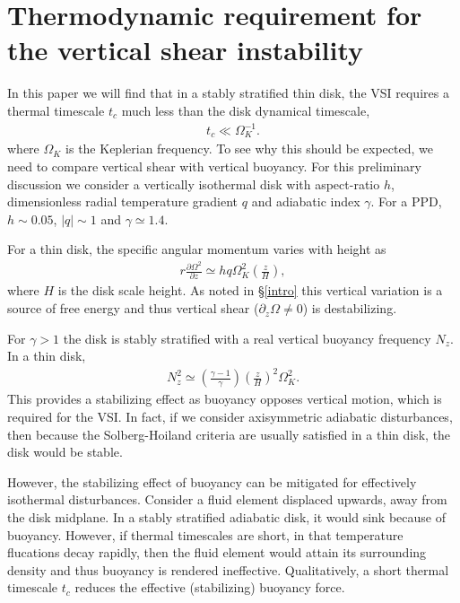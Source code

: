 \documentclass[iop]{emulateapj}
\newcommand{\p}{\partial}
\begin{document}
\section{Thermodynamic requirement for the vertical shear instability}\label{vsi_require}     In this paper we will find that in a stably stratified thin disk, the VSI  
requires a thermal timescale $t_c$ much less than the
disk dynamical timescale, 
\begin{align}
  t _c \ll \Omega_K^{-1}. 
\end{align}
where $\Omega_K$ is the Keplerian frequency. 
To see why this should be expected, we need to compare vertical shear
with vertical buoyancy. For this preliminary discussion we consider a
vertically isothermal disk with aspect-ratio $ h$,  
dimensionless radial temperature gradient $q$ and adiabatic index
$\gamma$. For a PPD, $ h \sim 0.05$, $|q|\sim 1$ and $\gamma\simeq 1.4$. 

For a thin disk, the specific angular momentum varies with height as 
\begin{align}\label{vshear_thin}
  r \frac{\p \Omega^2 }{\p z} \simeq  h q \Omega_K^2\left(\frac{z}{H}\right),
\end{align}
where $H$ is the disk scale height. As noted in
\S\ref{intro} this vertical variation is a source of free energy and
thus vertical shear ($\p_z\Omega \neq0$) is destabilizing. 

For $\gamma>1$ the disk is stably stratified with a real vertical
buoyancy frequency $N_z$.  In a thin disk,     
\begin{align}\label{nz_thin}
  N_z^2 \simeq \left(\frac{\gamma-1}{\gamma}\right) \left(\frac{z}{H}\right)^2
  \Omega_K^2.  
\end{align}
This provides a stabilizing effect as buoyancy opposes vertical
motion, which is required for the VSI. In fact, if we consider
axisymmetric adiabatic disturbances, then because the 
Solberg-Hoiland criteria \citep{tassoul78} are usually satisfied in a
thin disk, the disk would be stable. 

However, the stabilizing effect of buoyancy can be mitigated for 
effectively isothermal disturbances. Consider a fluid element displaced upwards, away from
the disk midplane. In a stably stratified adiabatic disk, it would
sink because of buoyancy. However, if thermal timescales are short, in
that temperature flucations decay rapidly, then the fluid element would attain its surrounding 
density and  
thus buoyancy is rendered ineffective. Qualitatively, a short thermal
timescale $t_c$ reduces the effective (stabilizing) buoyancy force.    
\end{document}
